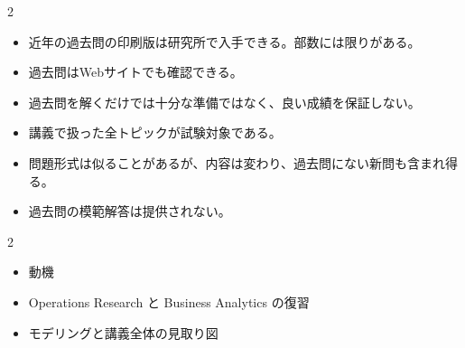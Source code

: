 \clearpage



\vspace{1.5mm}

\begin{multicols}{2}

\footnotesize

\raggedcolumns


\begin{itemize}
\item 近年の過去問の印刷版は研究所で入手できる。部数には限りがある。
\item 過去問はWebサイトでも確認できる。
\item 過去問を解くだけでは十分な準備ではなく、良い成績を保証しない。
\item 講義で扱った全トピックが試験対象である。
\item 問題形式は似ることがあるが、内容は変わり、過去問にない新問も含まれ得る。
\item 過去問の模範解答は提供されない。
\end{itemize}

\end{multicols}

\clearpage



\vspace{1.5mm}

\begin{multicols}{2}

\footnotesize

\raggedcolumns


\begin{itemize}
\item 動機
\item Operations Research と Business Analytics の復習
\item モデリングと講義全体の見取り図
\end{itemize}

\end{multicols}

\clearpage


